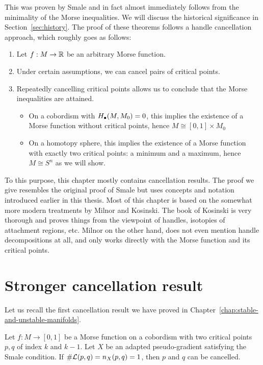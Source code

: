 This was proven by Smale and in fact almost immediately follows from the minimality of the Morse inequalities.
We will discuss the historical significance in Section~\ref{sec:history}.
The proof of these theorems follows a handle cancellation approach, which roughly goes as follows:
\begin{enumerate}[(1)]
    \item Let $f: M \to  \mathbb{R}$ be an arbitrary Morse function.
    \item Under certain assumptions, we can cancel pairs of critical points.
    \item Repeatedly cancelling critical points allows us to conclude that the Morse inequalities are attained.
        \begin{itemize}
            \item On a cobordism with $H_\bullet(M, M_0) = 0$, this implies the existence of a Morse function without critical points, hence $M \cong [0,1] \times M_0$
            \item On a homotopy sphere, this implies the existence of a Morse function with exactly two critical points: a minimum and a maximum,  hence $M \cong S^{n}$ as we will show.
        \end{itemize}
\end{enumerate}

To this purpose, this chapter mostly contains cancellation results.
The proof we give resembles the original proof of Smale but uses concepts and notation introduced earlier in this thesis.
Most of this chapter is based on the somewhat more modern treatments by Milnor and Kosinski.
The book of Kosinski is very thorough and proves things from the viewpoint of handles, isotopies of attachment regions, etc.
Milnor on the other hand, does not even mention handle decompositions at all, and only works directly with the Morse function and its critical points.




\section{Stronger cancellation result}
Let us recall the first cancellation result we have proved in Chapter~\ref{chap:stable-and-unstable-manifolds}.

\begingroup
\def\thetheorem{\ref{firstcancellation}}
\begin{theorem}
    Let $f: M \to  [0,1]$ be a Morse function on a cobordism with two critical points $p, q$ of index $k$ and  $k-1$. Let $X$ be an adapted pseudo-gradient satisfying the Smale condition.
    If $\# \mathcal L(p, q)  = n_{X}(p, q) = 1$, then $p$ and  $q$ can be cancelled.
\end{theorem}
\addtocounter{theorem}{-1}
\endgroup

